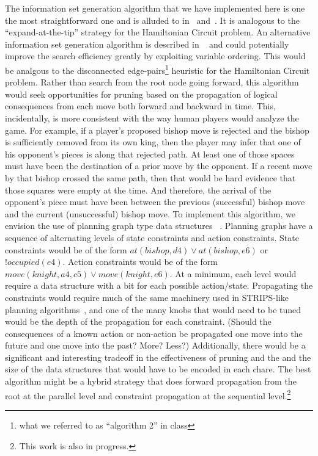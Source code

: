 \documentclass[11pt]{article}
\begin{document}
The information set generation algorithm that we have implemented here is one the most straightforward one and is
alluded to in~\cite{parker05game} and~\cite{russell05efficient}.  It is analogous to the ``expand-at-the-tip'' strategy
for the Hamiltonian Circuit problem.  An alternative information set generation algorithm is described in
~\cite{richards09information} and could potentially improve the search efficiency greatly by exploiting variable
ordering.  This would be analgous to the disconnected edge-pairs\footnote{what we referred to as ``algorithm 2'' in
class} heuristic for the Hamiltonian Circuit problem.  Rather than search from the root node going forward, this
algorithm would seek opportunities for pruning based on the propagation of logical consequences from each move both
forward and backward in time.  This, incidentally, is more consistent with the way human players would analyze the game.
For example, if a player's proposed bishop move is rejected and the bishop is sufficiently removed from its own king,
then the player may infer that one of his opponent's pieces is along that rejected path.  At least one of those spaces
must have been the destination of a prior move by the opponent.  If a recent move by that bishop crossed the same path,
then that would be hard evidence that those squares were empty at the time.  And therefore, the arrival of the
opponent's piece must have been between the previous (successful) bishop move and the current (unsuccessful) bishop
move.  To implement this algorithm, we envision the use of planning graph type data structures ~\cite{GRAPHPLAN}.
Planning graphs have a sequence of alternating levels of state constraints and action constraints.  State constraints
would be of the form $at(bishop,d4) \vee at(bishop,e6)$ or $!occupied(e4)$.  Action constraints would be of the form
$move(knight,a4,c5) \vee move(knight,e6)$.  At a minimum, each level would require a data structure with a bit for each
possible action/state.  Propagating the constraints would require much of the same machinery used in STRIPS-like
planning algorithms~\cite{STRIPS}, and one of the many knobs that would need to be tuned would be the depth of the
propagation for each constraint.  (Should the consequences of a known action or non-action be propagated one move into
the future and one move into the past?  More?  Less?)  Additionally, there would be a significant and interesting
tradeoff in the effectiveness of pruning and the and the size of the data structures that would have to be encoded in
each chare.  The best algorithm might be a hybrid strategy that does forward propagation from the root at the parallel
level and constraint propagation at the sequential level.\footnote{This work is also in progress.}
\end{document}
